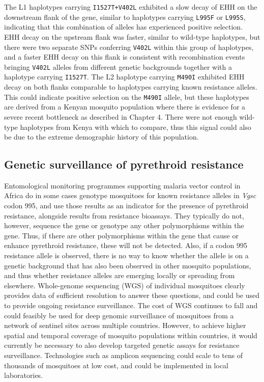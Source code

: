 \documentclass[a4paper,11pt,abstracton,hidelinks]{scrartcl}
\begin{document}
The L1 haplotypes carrying \texttt{I1527T+V402L} exhibited a slow decay of EHH on the downstream flank of the gene, similar to haplotypes carrying \texttt{L995F} or \texttt{L995S}, indicating that this combination of alleles has experienced positive selection.
%
EHH decay on the upstream flank was faster, similar to wild-type haplotypes, but there were two separate SNPs conferring \texttt{V402L} within this group of haplotypes, and a faster EHH decay on this flank is consistent with recombination events bringing \texttt{V402L} alleles from different genetic backgrounds together with a haplotype carrying \texttt{I1527T}.
%
The L2 haplotype carrying \texttt{M490I} exhibited EHH decay on both flanks comparable to haplotypes carrying known resistance alleles.
%
This could indicate positive selection on the \texttt{M490I} allele, but these haplotypes are derived from a Kenyan mosquito population where there is evidence for a severe recent bottleneck as described in Chapter 4.
%
There were not enough wild-type haplotypes from Kenya with which to compare, thus this signal could also be due to the extreme demographic history of this population.


\subsection{Genetic surveillance of pyrethroid resistance}\label{subsec:results-tracking}


Entomological monitoring programmes supporting malaria vector control in Africa do in some cases genotype mosquitoes for known resistance alleles in \textit{Vgsc} codon 995, and use those results as an indicator for the presence of pyrethroid resistance, alongside results from resistance bioassays.
%
They typically do not, however, sequence the gene or genotype any other polymorphisms within the gene.
%
Thus, if there are other polymorphisms within the gene that cause or enhance pyrethroid resistance, these will not be detected.
%
Also, if a codon 995 resistance allele is observed, there is no way to know whether the allele is on a genetic background that has also been observed in other mosquito populations, and thus whether resistance alleles are emerging locally or spreading from elsewhere.
%
Whole-genome sequencing (WGS) of individual mosquitoes clearly provides data of sufficient resolution to answer these questions, and could be used to provide ongoing resistance surveillance.
%
The cost of WGS continues to fall and could feasibly be used for deep genomic surveillance of mosquitoes from a network of sentinel sites across multiple countries.
%
However, to achieve higher spatial and temporal coverage of mosquito populations within countries, it would currently be necessary to also develop targeted genetic assays for resistance surveillance.
%
Technologies such as amplicon sequencing could scale to tens of thousands of mosquitoes at low cost, and could be implemented in local laboratories.
\end{document}

